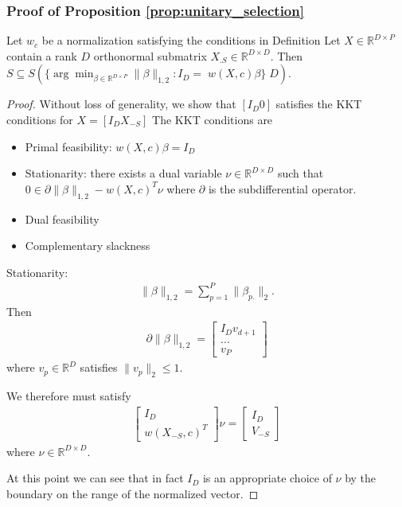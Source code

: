 \subsubsection{Proof of Proposition \ref{prop:unitary_selection}}
\label{sec:local_isometry_proof}

 \begin{proposition}
\label{prop:generalized_unitary_selection}
Let $w_c$ be a normalization satisfying the conditions in Definition %
Let $X \in \mathbb R^{D \times P}$ contain a rank $D$ orthonormal submatrix $X_{.S} \in \mathbb R^{D\times D}$.
Then $ S \subseteq S( \{\arg \min_{\beta \in \mathbb R^{D \times P}} \|\beta\|_{1,2} :  I_D = \; w(X,c) \beta\} \; D)$.
 \end{proposition}
 
 \begin{proof}
 
 Without loss of generality, we show that $[I_D 0]$ satisfies the KKT conditions for $X = [I_D X_{-S}]$
 The KKT conditions are 
 
\begin{itemize}
\item Primal feasibility: $w(X, c) \beta = I_D$
\item Stationarity: there exists a dual variable $\nu \in \mathbb{R}^{D \times D}$ such that $0 \in \partial \|\beta\|_{1,2} - w(X, c)^T \nu$  where $\partial$ is the subdifferential operator.
\item Dual feasibility
\item Complementary slackness
\end{itemize}

Stationarity: 
\begin{align}
\|\beta\|_{1,2} = \sum_{p = 1}^P \|\beta_{p.}\|_2.
\end{align}
Then
\begin{align}
\partial \|\beta\|_{1,2} = \begin{bmatrix}
I_D
v_{d+1} \\
\dotsc \\
v_P
\end{bmatrix}
\end{align}
where $v_p \in \mathbb R^{D}$ satisfies $\|v_p\|_2 \leq 1$.

We therefore must satisfy
\begin{align}
\begin{bmatrix}
I_D \\
w(X_{-S},c)^T
\end{bmatrix}\nu  = \begin{bmatrix}
I_D \\
V_{-S}
\end{bmatrix}
\end{align}
where $\nu \in \mathbb R^{D\times D}$.

At this point we can see that in fact $I_D$ is an appropriate choice of $\nu$ by the boundary on the range of the normalized vector.
 
\end{proof}

